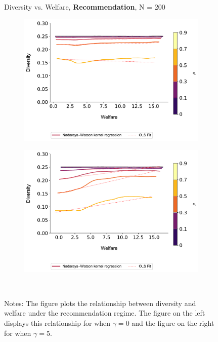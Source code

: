 \documentclass[format=acmsmall, review=false]{acmart}
\begin{document}
\addtocounter{figure}{-1}
\begin{figure}[ht]
\caption{Diversity vs. Welfare, \textbf{Recommendation}, N  = 200}
\begin{subfigure}{.45\textwidth}
\includegraphics[width=1.0\linewidth]{figures/diversity_welfare_rn_partial_n_200.pdf}
\end{subfigure}
\begin{subfigure}{.45\textwidth}
\includegraphics[width=1.0\linewidth]{figures/diversity_welfare_ra_partial_n_200.pdf}
\end{subfigure}\\
\caption*{\scriptsize Notes: The figure plots the relationship between diversity and welfare under the recommendation regime. The figure on the left displays this relationship for when $\gamma = 0$ and the figure on the right for when $\gamma = 5$.}\label{fig:diversity_welfare_ra_partial}
\end{figure}
\addtocounter{figure}{-1}
\end{document}
